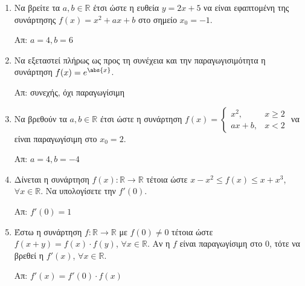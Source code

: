



\pagestyle{askhseis}




\begin{center}
  \minibox{\large \bfseries \textcolor{Col1}{Ασκήσεις στις Παραγώγους}}
\end{center}

\vspace{\baselineskip}

\begin{enumerate}

  \item Να βρείτε τα $ a, b \in \mathbb{R} $ έτσι ώστε η ευθεία $ y = 2x + 5
    $ να είναι εφαπτομένη της συνάρτησης $ f(x) = x^{2} + ax + b $ στο
    σημείο $ x_{0} = -1 $. 

    \hfill Απ: $ a = 4, b = 6 $

  \item Να εξεταστεί πλήρως ως προς τη συνέχεια και την παραγωγισιμότητα η
    συνάρτηση $ f(x) = e^{\abs{x}} $.

    \hfill Απ: συνεχής, όχι παραγωγίσιμη 

  \item Να βρεθούν τα $ a, b \in \mathbb{R} $ έτσι ώστε η συνάρτηση 
    $
    f(x) = \begin{cases}
      x^{2}, & x\geq 2 \\
      ax+b , & x<2
    \end{cases}
    $
    να είναι παραγωγίσιμη στο $ x_{0} = 2 $.

    \hfill Απ: $ a=4, b=-4 $

  \item Δίνεται η συνάρτηση $ f(x) \colon \mathbb{R} \to \mathbb{R} $ τέτοια
    ώστε $ x - x^{2} \leq f(x) \leq x + x^{3} $, $ \forall x \in \mathbb{R}
    $. Να υπολογίσετε την $ f'(0) $.

    \hfill Απ: $ f'(0) = 1 $

  \item Έστω η συνάρτηση $ f \colon \mathbb{R} \to \mathbb{R} $ με $ f(0)
    \neq 0	$ τέτοια ώστε $ f(x+y) = f(x) \cdot f(y) $, $ \forall x \in
    \mathbb{R} $. Αν η $f$ είναι παραγωγίσιμη στο $0$, τότε να βρεθεί η $
    f'(x) $, $ \forall x \in \mathbb{R} $.

    \hfill Απ: $ f'(x) = f'(0)\cdot f(x) $


\end{enumerate}
